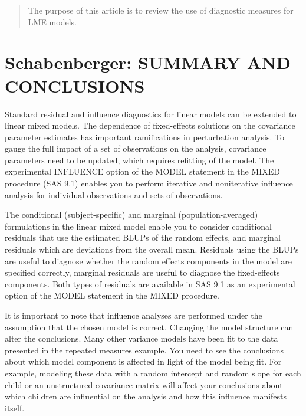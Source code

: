 
\begin{abstract}
The purpose of this article is to review the use of diagnostic measures for LME models.
\end{abstract}


\section{Schabenberger: SUMMARY AND CONCLUSIONS}

Standard residual and inﬂuence diagnostics for linear models can be extended to linear mixed models. The dependence of ﬁxed-effects solutions on the covariance parameter estimates has important ramiﬁcations in perturbation analysis. To gauge the full impact of a set of observations on the analysis, covariance parameters need to be updated, which requires reﬁtting of the model. The experimental INFLUENCE option of the MODEL statement in the MIXED procedure (SAS 9.1) enables you to perform iterative and noniterative inﬂuence analysis for individual observations and sets of observations.

The conditional (subject-speciﬁc) and marginal (population-averaged) formulations in the linear mixed model enable you to consider conditional residuals that use the estimated BLUPs of the random effects, and marginal residuals which are deviations from the overall mean. Residuals using the BLUPs are useful to diagnose whether the random effects components in the model are speciﬁed correctly, marginal residuals are useful to diagnose the ﬁxed-effects components. Both types of residuals are available in SAS 9.1 as an experimental option of the MODEL statement in the MIXED procedure.

It is important to note that inﬂuence analyses are performed under the assumption that the chosen model is correct. Changing the model structure can alter the conclusions. Many other variance models have been ﬁt to the data presented in the repeated measures example. You need to see the conclusions about which model component is affected in light of the model being ﬁt. For example, modeling these data with a random intercept and random slope for each child or an unstructured covariance matrix will affect your conclusions about which children are inﬂuential on the analysis and how this inﬂuence manifests itself.
